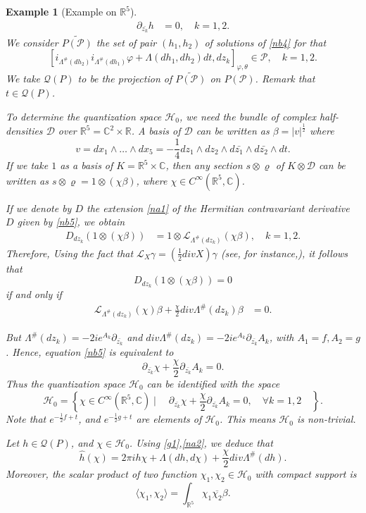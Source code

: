 \documentclass[a4paper,10pt]{article}
\numberwithin{equation}{section}
\theoremstyle{plain}
\newtheorem{example}{Example}
\begin{document}
\begin{example}[Example on $\mathbb{R}^5$]
	\begin{align}\label{nb4}
	\partial_{\bar{z_k}}h&=0,\quad k=1,2.
	\end{align}
	We consider $\widetilde{P(\mathcal{P})}$ the set of pair $(h_1,h_2)$ of solutions of \eqref{nb4} for that
	$$[i_{\Lambda^{\#}(dh_2)}i_{\Lambda^{\#}(dh_1)}\varphi+\Lambda(dh_1,dh_2)dt, dz_k]_{\varphi,\theta}\in\mathcal{P},\quad k=1,2.$$
	We take $\mathcal{Q}(P)$ to be the projection of $\widetilde{P(\mathcal{P})}$ on $P(\mathcal{P})$. Remark that $t\in\mathcal{Q}(P)$.\par  To determine the  quantization space $\mathcal{H}_0$, we need the bundle of complex half-densities $\mathcal{D}$ over  $\mathbb{R}^5=\mathbb{C}^2\times\mathbb{R}$.
	A basis of $\mathcal{D}$ can be written as   $\beta=|v|^{\frac{1}{2}}$  where
	$$v=dx_1\wedge\dots\wedge dx_5=-\frac{1}{4}dz_1\wedge dz_2\wedge d\bar{z_1}\wedge d\bar{z_2}\wedge dt.$$
	If we take $1$ as a basis of $K=\mathbb{R}^5 \times \mathbb{C}$, then any section $s\otimes\varrho$ of  $K\otimes\mathcal{D}$ can be written as
	$s\otimes\varrho=1\otimes(\chi\beta)$,  where $\chi\in C^\infty(\mathbb{R}^5,\mathbb{C})$.\par
	If we denote by $D$ the extension \eqref{na1} of the  Hermitian contravariant derivative $D$ given by \eqref{nb5}, we obtain
	\begin{align}
	D_{dz_k}(1\otimes(\chi\beta))&=1\otimes \mathcal{L}_{\Lambda^{\#}(dz_k)}(\chi\beta),\quad k=1,2.
	\end{align}
	Therefore, Using the fact that $\mathcal{L}_X\gamma=(\frac{1}{2}div X)\gamma$ (see, for instance,\cite{R25}), it follows that
	$$D_{dz_k}(1\otimes(\chi\beta))=0$$ if and only if
	\begin{align}\label{nb6}
	\mathcal{L}_{\Lambda^{\#}(dz_k)}(\chi)\beta+\frac{\chi}{2}div \Lambda^{\#}(dz_k)\beta&=0.
	\end{align}
	
	But $\Lambda^{\#}(dz_k)=-2ie^{A_k}\partial_{\bar{z_k}}$   and  $div\Lambda^{\#}(dz_k)=-2ie^{A_k}\partial_{\bar{z_k}}A_k$, with $A_1=f, A_2=g$.
	Hence, equation \eqref{nb5} is equivalent to $$ \partial_{\bar{z_k}}\chi+ \frac{\chi}{2}\partial_{\bar{z_k}}A_k=0.$$
	Thus the quantization space $\mathcal{H}_0$ can be identified  with the space
	$$\mathcal{H}_0=\left\{\chi\in C^\infty(\mathbb{R}^5,\mathbb{C})\mid \quad \partial_{\bar{z_k}}\chi+ \frac{\chi}{2}\partial_{\bar{z_k}}A_k=0,\quad
	\forall k=1,2\quad \right\}.$$
	Note that  $e^{-\frac{1}{2}f+t}$, and  $e^{-\frac{1}{2}g+t}$ are  elements of  $\mathcal{H}_0$. This means
	$\mathcal{H}_0$ is non-trivial.
	
	Let $h\in \mathcal{Q}(P)$, and $\chi\in \mathcal{H}_0$. Using  \eqref{g1},\eqref{na2}, we deduce that
	$$ \hat{h}(\chi)=2\pi i h\chi+\Lambda(dh,d\chi)+\dfrac{\chi}{2}div\Lambda^{\#}(dh).$$ Moreover, the scalar product of two function
	$\chi_1,\chi_2\in \mathcal{H}_0$ with compact support is $$\langle \chi_1,\chi_2\rangle=\int_{\mathbb{R}^5}\chi_1\overline{\chi_2}\beta.$$
\end{example}
	
\end{document}
